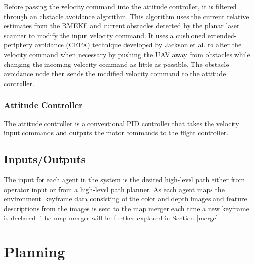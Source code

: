 \documentclass[letterpaper, 10 pt, conference]{ieeeconf}  %
\begin{document}
Before passing the velocity command into the attitude controller, it is filtered through an obstacle avoidance algorithm. This algorithm uses the current relative estimates from the RMEKF and current obstacles detected by the planar laser scanner to modify the input velocity command. It uses a cushioned extended-periphery avoidance (CEPA) technique developed by Jackson et al. \cite{Jackson2016} to alter the velocity command when necessary by pushing the UAV away from obstacles while changing the incoming velocity command as little as possible. The obstacle avoidance node then sends the modified velocity command to the attitude controller.

\subsubsection{Attitude Controller}

The attitude controller is a conventional PID controller that takes the velocity input commands and outputs the motor commands to the flight controller.

\subsection{Inputs/Outputs}

The input for each agent in the system is the desired high-level path either from operator input or from a high-level path planner. As each agent maps the environment, keyframe data consisting of the color and depth images and feature descriptions from the images is sent to the map merger each time a new keyframe is declared. The map merger will be further explored in Section \ref{merge}.

\section{Planning}\label{planning}
\end{document}
